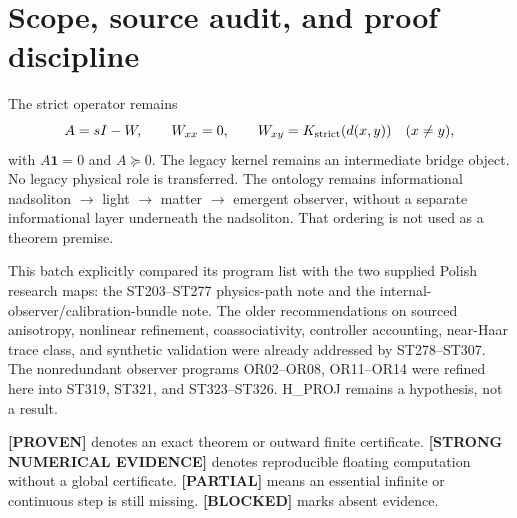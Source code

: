 \documentclass[11pt,a4paper]{article}
\newcommand{\Proven}{\textcolor{proved}{\textbf{[PROVEN]}}}
\newcommand{\Evidence}{\textcolor{conditional}{\textbf{[STRONG NUMERICAL EVIDENCE]}}}
\newcommand{\Partial}{\textcolor{conditional}{\textbf{[PARTIAL]}}}
\newcommand{\Blocked}{\textcolor{blocked}{\textbf{[BLOCKED]}}}
\begin{document}
\section{Scope, source audit, and proof discipline}

The strict operator remains
\[
A=sI-W,\qquad W_{xx}=0,\qquad
W_{xy}=K_{\rm strict}(d(x,y))\quad(x\ne y),
\]
with $A\mathbf1=0$ and $A\succeq0$. The legacy kernel remains an intermediate bridge
object. No legacy physical role is transferred. The ontology remains informational
nadsoliton $\to$ light $\to$ matter $\to$ emergent observer, without a separate
informational layer underneath the nadsoliton. That ordering is not used as a theorem
premise.

This batch explicitly compared its program list with the two supplied Polish research
maps: the ST203--ST277 physics-path note and the internal-observer/calibration-bundle note.
The older recommendations on sourced anisotropy, nonlinear refinement, coassociativity,
controller accounting, near-Haar trace class, and synthetic validation were already
addressed by ST278--ST307. The nonredundant observer programs OR02--OR08, OR11--OR14 were
refined here into ST319, ST321, and ST323--ST326. H\_PROJ remains a hypothesis, not a result.

\Proven{} denotes an exact theorem or outward finite certificate. \Evidence{} denotes
reproducible floating computation without a global certificate. \Partial{} means an
essential infinite or continuous step is still missing. \Blocked{} marks absent evidence.
\end{document}
